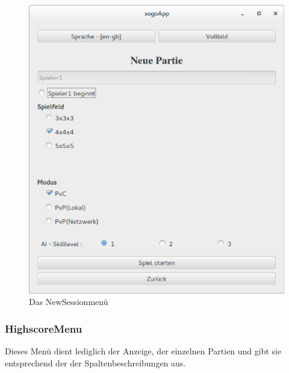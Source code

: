\documentclass[a4paper]{scrartcl}
\begin{document}
\begin{figure}[H]
 \centering
 \includegraphics[scale=0.35]{graphics/newsession.eps}
 \caption{Das NewSessionmenü}
 \label{fig:NewSessionmenü}
\end{figure}

\subsubsection{HighscoreMenu}\label{ch:HighscoreMenu}
Dieses Menü dient lediglich der Anzeige, der einzelnen Partien und gibt sie entsprechend der der Spaltenbeschreibungen aus. 
\end{document}
